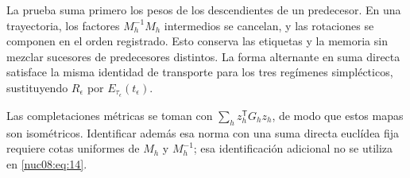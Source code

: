 La prueba suma primero los pesos de los descendientes de un predecesor. En una trayectoria, los factores \(M_h^{-1}M_h\) intermedios se cancelan, y las rotaciones se componen en el orden registrado. Esto conserva las etiquetas y la memoria sin mezclar sucesores de predecesores distintos. La forma alternante en suma directa satisface la misma identidad de transporte para los tres regímenes simplécticos, sustituyendo \(R_\epsilon\) por \(E_{\tau_\epsilon}(t_\epsilon)\).

Las completaciones métricas se toman con \(\sum_h z_h^\mathsf TG_hz_h\), de modo que estos mapas son isométricos. Identificar además esa norma con una suma directa euclídea fija requiere cotas uniformes de \(M_h\) y \(M_h^{-1}\); esa identificación adicional no se utiliza en \eqref{nuc08:eq:14}.
